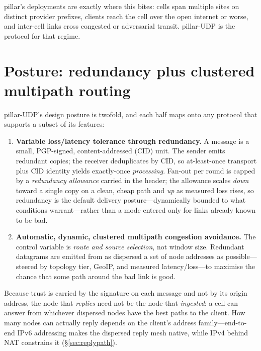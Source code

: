 \documentclass[10pt,twocolumn]{article}
\begin{document}
pillar's deployments are exactly where this bites: cells span multiple sites on
distinct provider prefixes, clients reach the cell over the open internet or
worse, and inter-cell links cross congested or adversarial transit. pillar-UDP
is the protocol for that regime.

\section{Posture: redundancy plus clustered multipath routing}
pillar-UDP's design posture is twofold, and each half maps onto any protocol
that supports a subset of its features:
\begin{enumerate}\itemsep2pt
  \item \textbf{Variable loss/latency tolerance through redundancy.} A message
  is a small, PGP-signed, content-addressed (CID) unit. The sender emits
  redundant copies; the receiver deduplicates by CID, so at-least-once
  transport plus CID identity yields exactly-once \emph{processing}. Fan-out per
  round is capped by a \emph{redundancy allowance} carried in the header; the
  allowance scales \emph{down} toward a single copy on a clean, cheap path and
  \emph{up} as measured loss rises, so redundancy is the default delivery
  posture---dynamically bounded to what conditions warrant---rather than a mode
  entered only for links already known to be bad.
  \item \textbf{Automatic, dynamic, clustered multipath congestion avoidance.}
  The control variable is \emph{route and source selection}, not window size.
  Redundant datagrams are emitted from as dispersed a set of node addresses as
  possible---steered by topology tier, GeoIP, and measured latency/loss---to
  maximise the chance that some path around the bad link is good.
\end{enumerate}
Because trust is carried by the signature on each message and not by its origin
address, the node that \emph{replies} need not be the node that
\emph{ingested}: a cell can answer from whichever dispersed nodes have the best
paths to the client. How many nodes can actually reply depends on the client's
address family---end-to-end IPv6 addressing makes the dispersed reply mesh
native, while IPv4 behind NAT constrains it (\S\ref{sec:replypath}).
\end{document}
